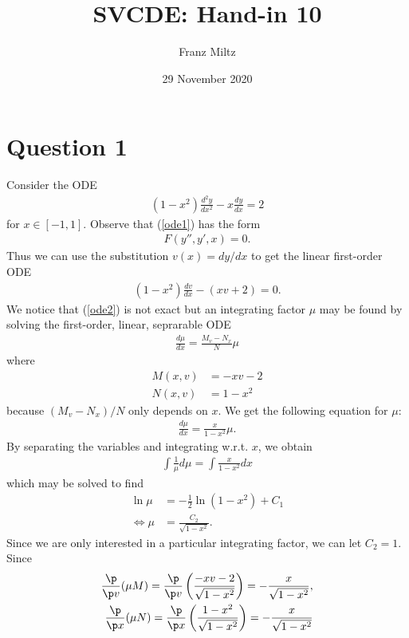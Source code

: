 \documentclass{article}
\begin{document}
\title{SVCDE: Hand-in 10}
\author{Franz Miltz}
\date{29 November 2020}
\maketitle


\section*{Question 1}


Consider the ODE
\begin{align}
	\label{ode1}
	(1-x^2)\frac{d^2y}{dx^2} - x\frac{dy}{dx} = 2
\end{align}
for $x\in [-1,1]$. Observe that (\ref{ode1}) has the form
\begin{align*}
	F(y'',y',x)=0.
\end{align*}
Thus we can use the substitution $v(x)=dy/dx$ to get the linear
first-order ODE
\begin{align}
	\label{ode2}
	(1-x^2)\frac{dv}{dx}-(xv+2) = 0.
\end{align}
We notice that (\ref{ode2}) is not exact but an integrating factor $\mu$ may
be found by solving the first-order, linear, seprarable ODE
\begin{align*}
	\frac{d\mu}{dx} = \frac{M_v-N_x}{N}\mu
\end{align*}
where
\begin{align*}
	M(x,v) & = -xv-2 \\
	N(x,v) & = 1-x^2
\end{align*}
because $(M_v-N_x)/N$ only depends on $x$. We get the following equation for
$\mu$:
\begin{align*}
	\frac{d\mu}{dx}=\frac{x}{1-x^2}\mu.
\end{align*}
By separating the variables and integrating w.r.t. $x$, we obtain
\begin{align*}
	\int \frac{1}{\mu}d\mu = \int \frac{x}{1-x^2}dx
\end{align*}
which may be solved to find
\begin{align*}
	\ln\mu              & = -\frac{1}{2}\ln(1-x^2)+C_1 \\
	\Leftrightarrow \mu & =\frac{C_2}{\sqrt{1-x^2}}.
\end{align*}
Since we are only interested in a particular integrating factor, we can
let $C_2=1$. Since
\begin{align*}
	\frac{\p}{\p v}(\mu M) = \frac{\p}{\p v}\left(\frac{-xv-2}{\sqrt{1-x^2}}\right)=-\frac{x}{\sqrt{1-x^2}}, \\
	\frac{\p}{\p x}(\mu N) = \frac{\p}{\p x}\left(\frac{1-x^2}{\sqrt{1-x^2}}\right)=-\frac{x}{\sqrt{1-x^2}}
\end{align*}
\end{document}

